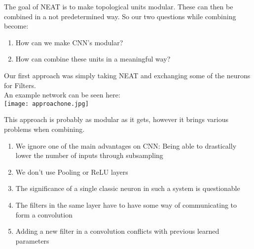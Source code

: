 The goal of NEAT is to make topological units modular.  
These can then be combined in a not predetermined way.  
So our two questions while combining become:  
\begin{enumerate}
	\item{How can we make CNN's modular?}  
	\item{How can combine these units in a meaningful way?}  
\end{enumerate}

Our first approach was simply taking NEAT and exchanging some of the neurons for Filters.\\
An example network can be seen here:\\

\texttt{[image: approachone.jpg]}  

This approach is probably as modular as it gets, however it brings various problems when combining.  
\begin{enumerate}
	\item{We ignore one of the main advantages on CNN: Being able to drastically lower the number of inputs through subsampling}
	\item{We don't use Pooling or ReLU layers}
	\item{The significance of a single classic neuron in such a system is questionable}
	\item{The filters in the same layer have to have some way of communicating to form a convolution}
	\item{Adding a new filter in a convolution conflicts with previous learned parameters}
\end{enumerate}

